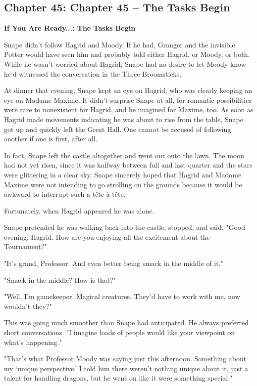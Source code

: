 \documentclass[a4paper,11pt]{article}
\begin{document}
\subsection{Chapter 45: Chapter 45 – The Tasks Begin}

\textbf{If You Are Ready...: The Tasks Begin}

Snape didn't follow Hagrid and Moody. If he had, Granger and the invisible Potter would have seen him and probably told either Hagrid, or Moody, or both. While he wasn't worried about Hagrid, Snape had no desire to let Moody know he'd witnessed the conversation in the Three Broomsticks.

At dinner that evening, Snape kept an eye on Hagrid, who was clearly keeping an eye on Madame Maxime. It didn't surprise Snape at all, for romantic possibilities were rare to nonexistent for Hagrid, and he imagined for Maxime, too. As soon as Hagrid made movements indicating he was about to rise from the table, Snape got up and quickly left the Great Hall. One cannot be accused of following another if one is first, after all.

In fact, Snape left the castle altogether and went out onto the lawn. The moon had not yet risen, since it was halfway between full and last quarter and the stars were glittering in a clear sky. Snape sincerely hoped that Hagrid and Madame Maxime were not intending to go strolling on the grounds because it would be awkward to interrupt such a tête-à-tête.

Fortunately, when Hagrid appeared he was alone.

Snape pretended he was walking back into the castle, stopped, and said, "Good evening, Hagrid. How are you enjoying all the excitement about the Tournament?"

"It's grand, Professor. And even better being smack in the middle of it."

"Smack in the middle? How is that?"

"Well, I'm gamekeeper. Magical creatures. They'd have to work with me, now wouldn't they?"

This was going much smoother than Snape had anticipated. He always preferred short conversations. "I imagine loads of people would like your viewpoint on what's happening."

"That's what Professor Moody was saying just this afternoon. Something about my `unique perspective.' I told him there weren't nothing unique about it, just a talent for handling dragons, but he went on like it were something special."
\end{document}

